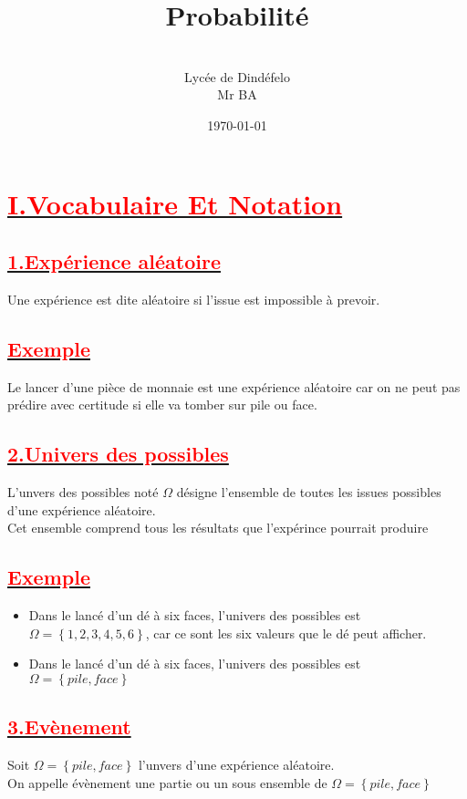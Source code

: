 \documentclass[12pt]{article}
\author{\\Lycée de Dindéfelo\\Mr BA}
\title{\textbf{Probabilité}}
\date{\today}
\begin{document}
\maketitle
\newpage
\section*{\underline{\textbf{\textcolor{red}{I.Vocabulaire Et Notation}}}}
\subsection*{\underline{\textbf{\textcolor{red}{1.Expérience aléatoire}}}}
Une expérience est dite aléatoire si l'issue est impossible à prevoir.\\
\subsection*{\underline{\textbf{\textcolor{red}{Exemple}}}}
Le lancer d'une pièce de monnaie est une expérience aléatoire car on ne peut pas prédire avec certitude si elle va tomber sur pile ou face.\\
\subsection*{\underline{\textbf{\textcolor{red}{2.Univers des possibles}}}}
L'unvers des possibles noté $\Omega$ désigne l'ensemble de toutes les issues possibles d'une expérience aléatoire.\\
Cet ensemble comprend tous les résultats que l'expérince pourrait produire
\subsection*{\underline{\textbf{\textcolor{red}{Exemple}}}}
\begin{itemize}
\item Dans le lancé d'un dé à six faces, l'univers des possibles est\\ 
$\Omega=\left\lbrace 1, 2, 3, 4, 5, 6\right\rbrace$, car ce sont les six valeurs que le dé peut afficher.\\
\item Dans le lancé d'un dé à six faces, l'univers des possibles est\\ 
$\Omega=\left\lbrace pile, face\right\rbrace$
\end{itemize}
\subsection*{\underline{\textbf{\textcolor{red}{3.Evènement}}}}
Soit $\Omega=\left\lbrace pile, face\right\rbrace$ l'unvers d'une expérience aléatoire.\\
On appelle évènement une partie ou un sous ensemble de
$\Omega=\left\lbrace pile, face\right\rbrace$
\end{document}
